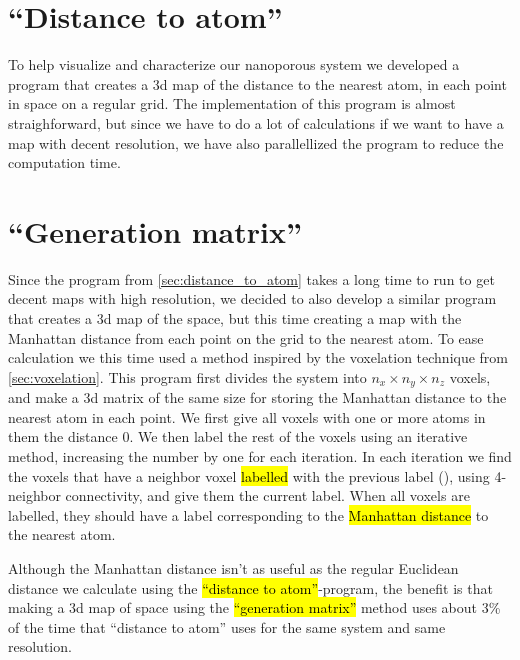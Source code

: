 \section{``Distance to atom''\label{sec:distance_to_atom}}
To help visualize and characterize our nanoporous system we developed a program that creates a 3d map of the distance to the nearest atom, in each point in space on a regular grid. The implementation of this program is almost straighforward, but since we have to do a lot of calculations if we want to have a map with decent resolution, we have also parallellized the program to reduce the computation time.

\section{``Generation matrix''}
Since the program from \cref{sec:distance_to_atom} takes a long time to run to get decent maps with high resolution, we decided to also develop a similar program that creates a 3d map of the space, but this time creating a map with the Manhattan distance from each point on the grid to the nearest atom. To ease calculation we this time used a method inspired by the voxelation technique from \cref{sec:voxelation}. This program first divides the system into $n_x\times n_y\times n_z$ voxels, and make a 3d matrix of the same size for storing the Manhattan distance to the nearest atom in each point. We first give all voxels with one or more atoms in them the distance 0. We then label the rest of the voxels using an iterative method, increasing the number by one for each iteration. In each iteration we find the voxels that have a neighbor voxel \hl{labelled} with the previous label (), using 4-neighbor connectivity, and give them the current label. When all voxels are labelled, they should have a label corresponding to the \hl{Manhattan distance} to the nearest atom.

Although the Manhattan distance isn't as useful as the regular Euclidean distance we calculate using the \hl{``distance to atom''}-program, the benefit is that making a 3d map of space using the \hl{``generation matrix''} method uses about 3\% of the time that ``distance to atom'' uses for the same system and same resolution. 



